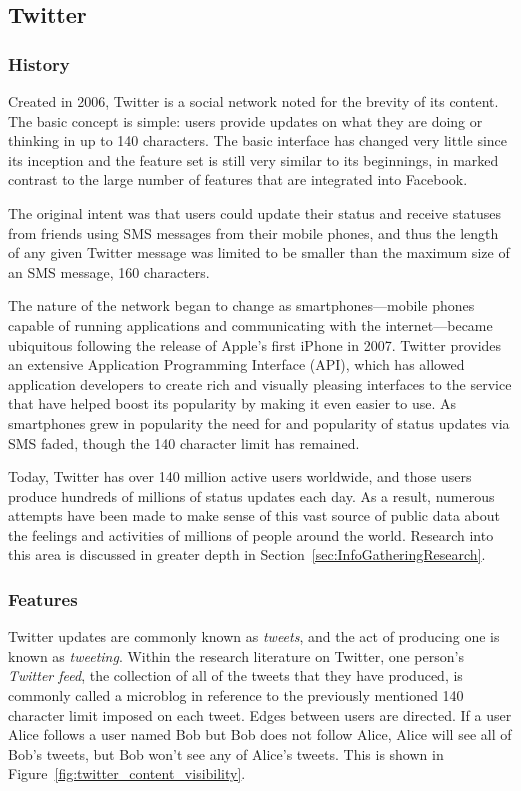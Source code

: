 \subsection{Twitter}

\subsubsection{History}

Created in 2006, Twitter is a social network noted for the brevity of its content. The basic concept is simple: users provide updates on what they are doing or thinking in up to 140 characters. The basic interface has changed very little since its inception and the feature set is still very similar to its beginnings, in marked contrast to the large number of features that are integrated into Facebook.

The original intent was that users could update their status and receive statuses from friends using SMS messages from their mobile phones, and thus the length of any given Twitter message was limited to be smaller than the maximum size of an SMS message, 160 characters.

The nature of the network began to change as smartphones---mobile phones capable of running applications and communicating with the internet---became ubiquitous following the release of Apple's first iPhone in 2007. Twitter provides an extensive Application Programming Interface (API), which has allowed application developers to create rich and visually pleasing interfaces to the service that have helped boost its popularity by making it even easier to use. As smartphones grew in popularity the need for and popularity of status updates via SMS faded, though the 140 character limit has remained.

Today, Twitter has over 140 million active users worldwide, and those users produce hundreds of millions of status updates each day. As a result, numerous attempts have been made to make sense of this vast source of public data about the feelings and activities of millions of people around the world. Research into this area is discussed in greater depth in Section~\ref{sec:InfoGatheringResearch}.

\subsubsection{Features}

Twitter updates are commonly known as \emph{tweets}, and the act of producing one is known as \emph{tweeting}. Within the research literature on Twitter, one person's \emph{Twitter feed}, the collection of all of the tweets that they have produced, is commonly called a microblog in reference to the previously mentioned 140 character limit imposed on each tweet. Edges between users are directed. If a user Alice follows a user named Bob but Bob does not follow Alice, Alice will see all of Bob's tweets, but Bob won't see any of Alice's tweets. This is shown in Figure~\ref{fig:twitter_content_visibility}.


